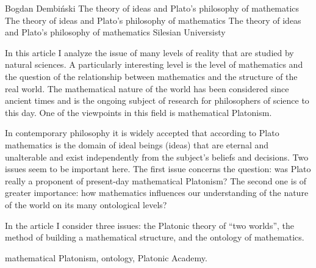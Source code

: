 \begin{artengenv}{Bogdan Dembiński}
	{The theory of ideas and Plato’s philosophy of mathematics}
	{The theory of ideas and Plato’s philosophy of mathematics}
	{The theory of ideas and Plato’s philosophy of mathematics}
	{Silesian Universisty}
	{In this article I analyze the issue of many levels of reality that are studied by natural sciences. A particularly
		interesting level is the level of mathematics and the question of the relationship between mathematics and the
		structure of the real world. The mathematical nature of the world has been considered since ancient times and is the
		ongoing subject of research for philosophers of science to this day. One of the viewpoints in this field is
		mathematical Platonism.
		
		In contemporary philosophy it is widely accepted that according to Plato mathematics is the domain of ideal beings
		(ideas) that are eternal and unalterable and exist independently from the subject's beliefs and decisions. Two issues
		seem to be important here. The first issue concerns the question: was Plato really a proponent of present-day
		mathematical Platonism? The second one is of greater importance: how mathematics influences our understanding of the
		nature of the world on its many ontological levels?
		
		In the article I consider three issues: the Platonic theory of ``two worlds'', the method of
		building a mathematical structure, and the ontology of mathematics.}
	{mathematical Platonism, ontology, Platonic Academy.}








\end{artengenv}
